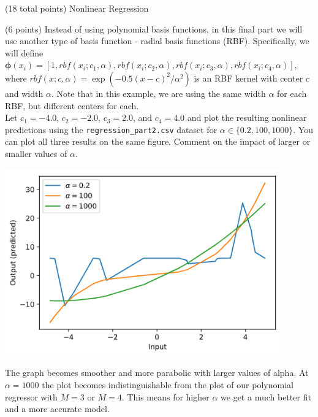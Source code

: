 \documentclass[12pt]{article}
\begin{document}
\begin{question}{(18 total points) Nonlinear Regression}
%
%
\begin{subquestion}{(6 points) Instead of using polynomial basis functions, in this final part we will use another type of basis function - radial basis functions (RBF). 
Specifically, we will define $\boldsymbol{\phi}(x_i) = [1, rbf(x_i; c_1, \alpha), rbf(x_i; c_2, \alpha), rbf(x_i; c_3, \alpha), rbf(x_i; c_4, \alpha)]$, where $rbf(x; c, \alpha) =  \exp(-0.5(x-c)^2 / \alpha^2)$ is an RBF kernel with center $c$ and width $\alpha$. Note that in this example, we are using the same width $\alpha$ for each RBF, but different centers for each.\\ 
Let $c_1=-4.0$, $c_2=-2.0$, $c_3=2.0$, and $c_4=4.0$ and plot the resulting nonlinear predictions using the \texttt{regression\_part2.csv} dataset for $\alpha \in \{0.2, 100, 1000\}$. 
You can plot all three results on the same figure.
Comment on the impact of larger or smaller values of $\alpha$.
}


\begin{answerbox}{35em}
\begin{center}
    \includegraphics[width=0.9\textwidth]{results/rbf-alpha-predictions.png}
\end{center}
The graph becomes smoother and more parabolic with larger values of alpha. At $\alpha = 1000$ the plot becomes indistinguishable from the plot of our polynomial regressor with $M=3$ or $M=4$. This means for higher $\alpha$ we get a much better fit and a more accurate model.
\end{answerbox}



\end{subquestion}



\end{question}
\end{document}
